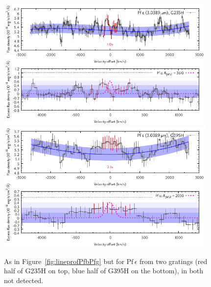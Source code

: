 \documentclass[twocolumn,twocolumnappendix]{aastex631}
\def\Pfe{\ensuremath{\mathrm{Pf}\,\epsilon}\xspace}         %
\begin{document}
\begin{figure}
 \centering
 \includegraphics[width=0.97\textwidth]{TWA27b_g235h-f170lp_rood_sigkorr_Pfe_Dv2700_ohni300_Abb_simul.pdf}
 \includegraphics[width=0.97\textwidth]{TWA27b_g395h-f290lp_blauw_sigkorr_Pfe_Dv2700_ohni300_Abb_simul.pdf}
\caption{%
As in Figure~\ref{fig:lineprofPfbPfg} but for \Pfe from two gratings (red half of G235H on top, blue half of G395H on the bottom), in both not detected.
}
\label{fig:lineprofPfe}
\end{figure}




%
%
%
%
%
%
%
%
%


%
%
%
%


%
%
%
%
%
%
%
%
%



%
%
%
%
%
%
%
%
%
%






%
%


{}
%



%
%
%
%
%
%


%
%
%
\end{document}
